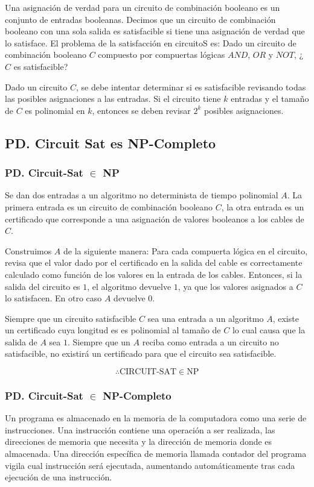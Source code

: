 \documentclass[letterpaper,12pt]{article}
\newcommand{\ccb}{circuito de combinación booleano }
\begin{document}
Una asignación de verdad para un \ccb es un conjunto de entradas booleanas. 
Decimos que un \ccb con una sola salida es satisfacible si tiene una asignación
de verdad que lo satisface. El problema de la satisfacción en circuitoS es: Dado un 
\ccb $C$ compuesto por compuertas lógicas $AND$, $OR$ y $NOT$, ¿$C$ es satisfacible?

Dado un circuito $C$, se debe intentar determinar si es satisfacible revisando
todas las posibles asignaciones a las entradas. Si el circuito tiene $k$ entradas y 
el tamaño de $C$ es polinomial en $k$, entonces se deben revisar $2^k$ posibles 
asignaciones.

\subsection{PD. Circuit Sat es NP-Completo}
\subsubsection{PD. Circuit-Sat $\in$ NP}

Se dan dos entradas a un algoritmo no determinista de tiempo polinomial $A$. La
primera entrada es un \ccb $C$, la otra entrada es un certificado que corresponde a
una asignación de valores booleanos a los cables de $C$.

Construimos $A$ de la siguiente manera: Para cada compuerta lógica en el circuito, 
revisa que el valor dado por el certificado en la salida del cable es correctamente
calculado como función de los valores en la entrada de los cables. Entonces, si la
salida del circuito es $1$, el algoritmo devuelve $1$, ya que los valores 
asignados a $C$ lo satisfacen. En otro caso $A$ devuelve $0$.

Siempre que un circuito satisfacible $C$ sea una entrada a un algoritmo $A$, existe
un certificado cuya longitud es es polinomial al tamaño de $C$ lo cual causa que la
salida de $A$ sea $1$. Siempre que un $A$ reciba como entrada a un circuito no 
satisfacible, no existirá un certificado para que el circuito sea satisfacible. 

$$ \therefore \text{CIRCUIT-SAT} \in \text{NP} $$

\subsubsection{PD. Circuit-Sat $\in$ NP-Completo}

Un programa es almacenado en la memoria de la computadora como una serie de 
instrucciones. Una instrucción contiene una operación a ser realizada, las 
direcciones de memoria que necesita y la dirección de memoria donde es almacenada.
Una dirección específica de memoria llamada contador del programa vigila
cual instrucción será ejecutada, aumentando automáticamente tras cada ejecución 
de una instrucción. 
\end{document}
